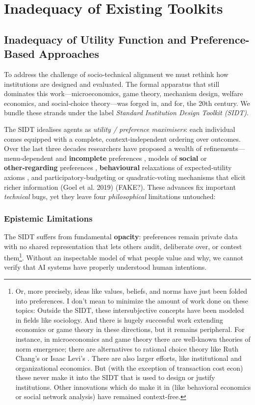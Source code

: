 \section{Inadequacy of Existing Toolkits}

\subsection{Inadequacy of Utility Function and Preference-Based Approaches}

To address the challenge of socio‑technical alignment we must rethink how institutions are designed and evaluated. The formal apparatus that still dominates this work—microeconomics, game theory, mechanism design, welfare economics, and social‑choice theory—was forged in, and for, the 20th century. We bundle these strands under the label \textit{Standard Institution Design Toolkit (SIDT)}.

The SIDT idealises agents as \textit{utility / preference maximisers}: each individual comes equipped with a complete, context‑independent ordering over outcomes. Over the last three decades researchers have proposed a wealth of refinements—menu‑dependent and \textbf{incomplete} preferences \cite{gul2001, bewley2002}, models of \textbf{social} or \textbf{other‑regarding} preferences \cite{fehr1999}, \textbf{behavioural} relaxations of expected‑utility axioms \cite{tversky1992}, and participatory-budgeting or quadratic-voting mechanisms that elicit richer information (Goel et al. 2019) (FAKE?). These advances fix important \textit{technical} bugs, yet they leave four \textit{philosophical} limitations untouched:

\subsubsection{Epistemic Limitations}

The SIDT suffers from fundamental \textbf{opacity}: preferences remain private data with no shared representation that lets others audit, deliberate over, or contest them\footnote{Or, more precisely, ideas like values, beliefs, and norms have just been folded into preferences. I don't mean to minimize the amount of work done on these topics: Outside the SIDT, these intersubjective concepts have been modeled in fields like sociology. And there is hugely successful work extending economics or game theory in these directions, but it remains peripheral. For instance, in microeconomics and game theory there are well-known theories of norm emergence; there are alternatives to rational choice theory like Ruth Chang's \cite{chang1997} or Isaac Levi's \cite{levi1986}. There are also larger efforts, like institutional and organizational economics. But (with the exception of transaction cost econ) these never make it into the SIDT that is used to design or justify institutions. Other innovations which do make it in (like behavioral economics or social network analysis) have remained context-free.}. Without an inspectable model of what people value and why, we cannot verify that AI systems have properly understood human intentions.

